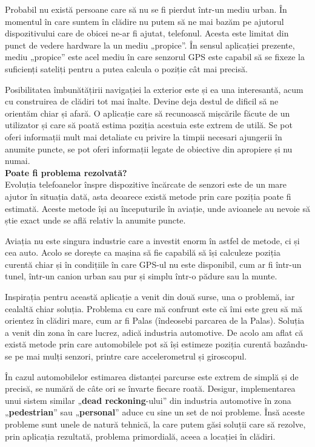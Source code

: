 \documentclass[12pt, a4paper, oneside]{article}
\begin{document}
Probabil nu există persoane care să nu se fi pierdut într-un mediu urban. În momentul în care suntem în clădire nu putem să ne mai bazăm pe ajutorul dispozitivului care de obicei ne-ar fi ajutat, telefonul. Acesta este limitat din punct de vedere hardware la un mediu „propice”. În sensul aplicației prezente, mediu „propice” este acel mediu în care senzorul GPS este capabil să se fixeze la suficienți sateliți pentru a putea calcula o poziție cât mai precisă.

Posibilitatea îmbunătățirii navigației la exterior este și ea una interesantă, acum cu construirea de clădiri tot mai înalte. Devine deja destul de dificil să ne orientăm chiar și afară. O aplicație care să recunoască mișcările făcute de un utilizator și care să poată estima poziția acestuia este extrem de utilă. Se pot oferi informații mult mai detaliate cu privire la timpii necesari ajungerii în anumite puncte, se pot oferi informații legate de obiective din apropiere și nu numai.\\

\textbf{Poate fi problema rezolvată?}\\
Evoluția telefoanelor înspre dispozitive încărcate de senzori este de un mare ajutor în situația dată, asta deoarece există metode prin care poziția poate fi estimată. Aceste metode își au începuturile în aviație, unde avioanele au nevoie să știe exact unde se află relativ la anumite puncte. 

Aviația nu este singura industrie care a investit enorm în astfel de metode, ci și cea auto. Acolo se dorește ca mașina să fie capabilă să își calculeze poziția curentă chiar și în condițiile în care GPS-ul nu este disponibil, cum ar fi într-un tunel, într-un canion urban sau pur și simplu într-o pădure sau la munte.

Inspirația pentru această aplicație a venit din două surse, una o problemă, iar cealaltă chiar soluția. Problema cu care mă confrunt este că îmi este greu să mă orientez în clădiri mare, cum ar fi Palas (îndeosebi parcarea de la Palas). Soluția a venit din zona în care lucrez, adică industria automotive. De acolo am aflat că există metode prin care automobilele pot să își estimeze poziția curentă bazându-se pe mai mulți senzori, printre care accelerometrul și giroscopul. 

În cazul automobilelor estimarea distanței parcurse este extrem de simplă și de precisă, se numără de câte ori se învarte fiecare roată. Desigur, implementarea unui sistem similar „\textbf{dead reckoning}-ului” din industria automotive în zona „\textbf{pedestrian}” sau „\textbf{personal}” aduce cu sine un set de noi probleme. Însă aceste probleme sunt unele de natură tehnică, la care putem găsi soluții care să rezolve, prin aplicația rezultată, problema primordială, aceea a locației în clădiri.\\
\end{document}
